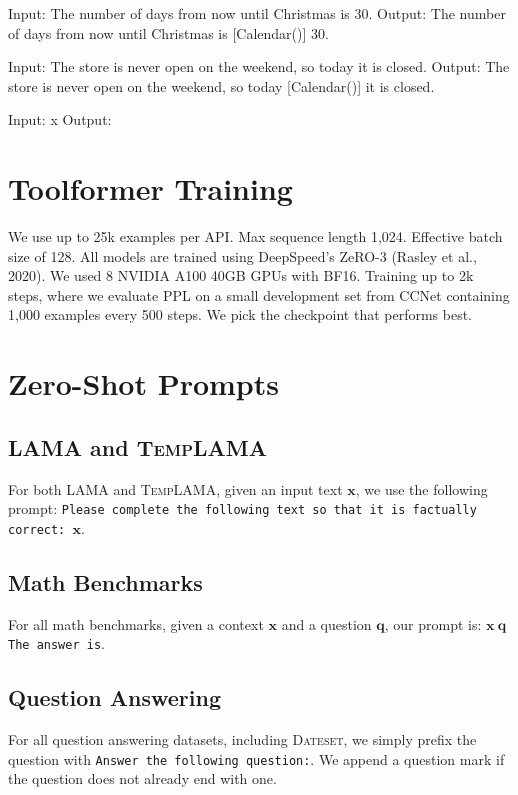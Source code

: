 \documentclass[11pt]{article}
\begin{document}
\begin{CJK*}{UTF8}{gbsn}
{\begin{spverbatim}
Input: The number of days from now until Christmas is 30. 
Output: The number of days from now until Christmas is [Calendar()] 30.

Input: The store is never open on the weekend, so today it is closed. 
Output: The store is never open on the weekend, so today [Calendar()] it is closed.

Input: x
Output:
\end{spverbatim}}

\section{Toolformer Training}
\label{appendix:finetuning}

We use up to 25k examples per API. Max sequence length 1,024. Effective batch size of 128.  All models are trained using DeepSpeed’s ZeRO-3 (Rasley
et al., 2020). We used 8 NVIDIA A100 40GB GPUs with BF16. Training up to 2k steps, where we evaluate PPL on a small development set from CCNet containing 1,000 examples every 500 steps. We pick the checkpoint that performs best. 

\section{Zero-Shot Prompts}

\subsection{LAMA and \textsc{TempLAMA}}

For both LAMA and \textsc{TempLAMA}, given an input text $\mathbf{x}$, we use the following prompt: \texttt{Please complete the following text so that it is factually correct: $\mathbf{x}$}.

\subsection{Math Benchmarks}

For all math benchmarks, given a context $\mathbf{x}$ and a question $\mathbf{q}$, our prompt is: $\mathbf{x}\ \mathbf{q}$ \texttt{The answer is}.

\subsection{Question Answering}

For all question answering datasets, including \textsc{Dateset}, we simply prefix the question with \texttt{Answer the following question:}. We append a question mark if the question does not already end with one.


\end{CJK*}
\end{document}
